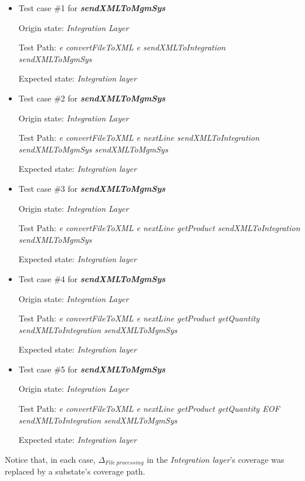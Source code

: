 \begin{itemize}

\item Test case \#1 for \textit{\textbf{sendXMLToMgmSys}}

Origin state: \textit{Integration Layer}

Test Path: \textit{e convertFileToXML e sendXMLToIntegration sendXMLToMgmSys}

Expected state: \textit{Integration layer}

\item Test case \#2 for \textit{\textbf{sendXMLToMgmSys}}

Origin state: \textit{Integration Layer}

Test Path: \textit{e convertFileToXML e  nextLine sendXMLToIntegration sendXMLToMgmSys sendXMLToMgmSys}

Expected state: \textit{Integration layer}


\item Test case \#3 for \textit{\textbf{sendXMLToMgmSys}}

Origin state: \textit{Integration Layer}

Test Path: \textit{e convertFileToXML e  nextLine  getProduct sendXMLToIntegration sendXMLToMgmSys}

Expected state: \textit{Integration layer}

\item Test case \#4 for \textit{\textbf{sendXMLToMgmSys}}

Origin state: \textit{Integration Layer}

Test Path: \textit{e convertFileToXML e  nextLine  getProduct  getQuantity sendXMLToIntegration sendXMLToMgmSys}

Expected state: \textit{Integration layer}

\item Test case \#5 for \textit{\textbf{sendXMLToMgmSys}}

Origin state: \textit{Integration Layer}

Test Path: \textit{e convertFileToXML e  nextLine  getProduct  getQuantity EOF sendXMLToIntegration sendXMLToMgmSys}

Expected state: \textit{Integration layer}

\end{itemize}

Notice that, in each case, $\Delta_{File\ processing}$ in the \textit{Integration layer}'s coverage was replaced by a substate's coverage path.

